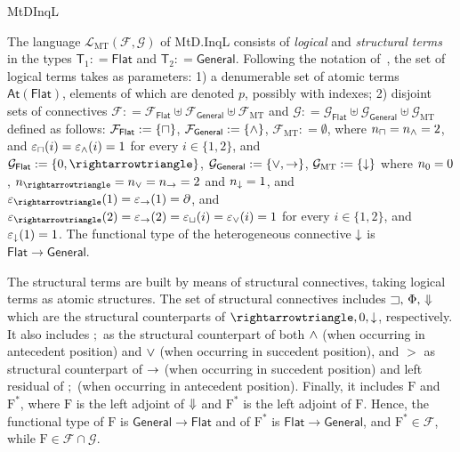 \begin{entry}{MtDInqL}
\begin{clarifications}
  The language $\mathcal{L}_\mathrm{MT}(\mathcal{F}, \mathcal{G})$ of  MtD.InqL
  consists of  {\em logical}   and {\em structural terms} in the types
  $\mathsf{T}_1:  = \mathsf{Flat}$ and $\mathsf{T}_2: = \mathsf{General}$.
  Following the notation of~, the set  of logical terms takes as
  parameters: 1) a denumerable  set of atomic terms $\mathsf{At}(\mathsf{Flat})$,
  elements of which are denoted $p$, possibly with indexes; 2) disjoint sets of
  connectives 
  $\mathcal{F}: = \mathcal{F}_{\mathsf{Flat}}\uplus\mathcal{F}_{\mathsf{General}}\uplus\mathcal{F}_{\mathrm{MT}}$
  and 
  $\mathcal{G}: = \mathcal{G}_{\mathsf{Flat}}\uplus\mathcal{G}_{\mathsf{General}}\uplus\mathcal{G}_{\mathrm{MT}}$
  defined as follows:
  $\mathcal{F}_{\mathsf{Flat}}: = \{\sqcap\}$, $\mathcal{F}_{\mathsf{General}}: = \{\wedge \}$, $\mathcal{F}_{\mathrm{MT}}: = \emptyset$, 
  where $n_\sqcap = n_\wedge = 2$, 
  and $\varepsilon_{\sqcap}(i) = \varepsilon_{\wedge}(i) = 1$ for every $i\in \{1, 2\}$, 
  and
  $\mathcal{G}_{\mathsf{Flat}}: = \{\cbot, \cra\}$, $\mathcal{G}_{\mathsf{General}}: = \{\vee,\to \}$, $\mathcal{G}_{\mathrm{MT}}: = \{{\downarrow}\}$ 
  where  $n_0 = 0$, $n_\cra = n_\ior = n_{\ira} =  2$ 
  and $n_{{\downarrow}} = 1$, 
  and $\varepsilon_{\cra}(1) = \varepsilon_{\ira}(1) = \partial$, 
  and $\varepsilon_{\cra}(2) = \varepsilon_{\ira}(2) = \varepsilon_{\cor}(i) = \varepsilon_{\ior}(i) = 1$ 
  for every $i\in \{1, 2\}$, 
  and $\varepsilon_{{\downarrow}}(1) = 1$. 
  The functional type of the heterogeneous connective ${\downarrow}$ is
  $\mathsf{Flat}\rightarrow \mathsf{General}$.
  
  The structural terms are built by means of structural connectives, taking
  logical terms as atomic structures. The set of structural connectives includes
  $\sqsupset,\, \Phi,\, {\Downarrow}$   which are the structural counterparts of $\cra, \cbot,
  \bh$, respectively.  It also includes $;$  as the structural counterpart of both
  $\wedge$ (when occurring in antecedent position) and $\vee$ (when occurring in
  succedent position), and $>$ as structural counterpart of  $\to$ (when
  occurring in succedent position) and left residual of $;$ (when occurring in
  antecedent position).
  Finally, it includes $\mathrm{F}$ and $\mathrm{F}^\ast$, where $\mathrm{F}$ is
  the left adjoint of ${\Downarrow}$ and  $\mathrm{F}^\ast$ is the left  adjoint of
  $\mathrm{F}$. Hence, the functional type of $\mathrm{F}$ is
  $\mathsf{General}\rightarrow \mathsf{Flat}$ and of $\mathrm{F}^\ast$ is
  $\mathsf{Flat}\rightarrow \mathsf{General}$, and  $\mathrm{F}^\ast\in
  \mathcal{F}$, while $\mathrm{F}\in \mathcal{F}\cap \mathcal{G}$.
  

\end{clarifications}
\end{entry}
